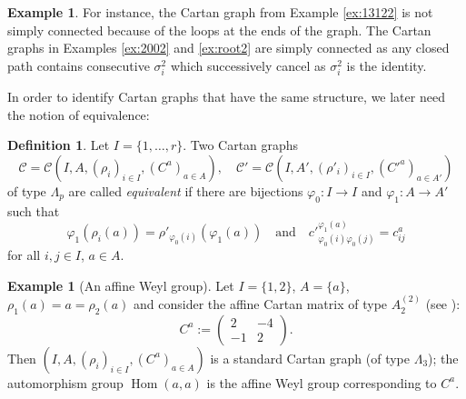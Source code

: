 \documentclass[11pt,a4paper]{amsart}
\theoremstyle{definition}
\newtheorem{Definition}[Lemma]{Definition}
\newtheorem{Example}[Lemma]{Example}
\numberwithin{equation}{section}
\DeclareMathOperator{\Hom}{Hom}
\newcommand{\rfl }{\rho }
\newcommand{\Cm }{C}
\newcommand{\Cc }{\mathcal{C}}
\begin{document}
\begin{Example}
For instance, the Cartan graph from Example \ref{ex:13122} is not simply connected because of the loops at the ends of the graph. The Cartan graphs in Examples \ref{ex:2002} and \ref{ex:root2} are simply connected as any closed path contains consecutive $\sigma_i^2$ which successively cancel as $\sigma_i^2$ is the identity. 
\end{Example}

In order to identify Cartan graphs that have the same structure, we later need the notion of equivalence:
\begin{Definition} 
\label{def:Cartanequiv}
Let $I=\{1,\ldots,r\}$.
Two Cartan graphs
$$\Cc = \Cc (I,A,(\rfl _i)_{i \in I}, (\Cm ^a)_{a \in A}), \quad \Cc' = \Cc (I,A',(\rfl' _i)_{i \in I}, ({\Cm'} ^a)_{a \in A'})$$
of type $\Lambda_p$ 
are called \emph{equivalent} if there are bijections $\varphi_0: I \to I$
and 
$\varphi_1: A \to A'$ 
such that
$$ \varphi_1(\rfl_i(a)) = \rfl'_{\varphi_0(i)}(\varphi_1(a))
\quad\text{and}\quad {c'}_{\varphi_0(i)\varphi_0(j)}^{\varphi_1(a)} = c_{ij}^a
$$
for all $i,j \in I$, $a \in A$.
\end{Definition}

\begin{Example}[An affine Weyl group]\label{affine41}
Let $I=\{1,2\}$, $A=\{a\}$, $\rfl_1(a)=a=\rfl_2(a)$ and consider the affine Cartan matrix of type $A_2^{(2)}$ 
(see \cite[Paragraph 4.8]{b-Kac90}):
$$ C^a :=
\begin{pmatrix} 2 & -4 \\ -1 & 2 \end{pmatrix}
. $$
Then $(I,A,(\rfl _i)_{i\in I},(\Cm ^a)_{a\in A})$ is a standard Cartan graph (of type $\Lambda_3$); the automorphism group $\Hom(a,a)$ is the affine Weyl group corresponding to $C^a$.
\end{Example}
\end{document}
